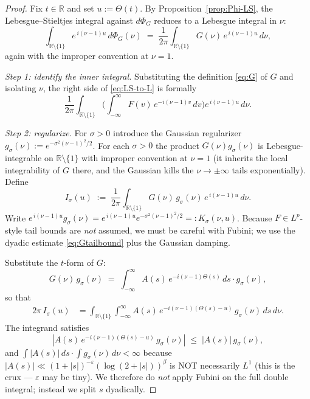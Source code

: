 \documentclass[11pt]{article}
\begin{document}
\begin{proof}
Fix $t\in\mathbb R$ and set $u:=\Theta(t)$. By Proposition~\ref{prop:Phi-LS}, the Lebesgue--Stieltjes integral against $d\Phi_G$ reduces to a Lebesgue integral in $\nu$:
\begin{equation}\label{eq:LS-to-L}
\int_{\mathbb R\setminus\{1\}} e^{\,i(\nu-1)u}\,d\Phi_G(\nu)
\;=\;
\frac{1}{2\pi}\int_{\mathbb R\setminus\{1\}} G(\nu)\,e^{\,i(\nu-1)u}\,d\nu,
\end{equation}
again with the improper convention at $\nu=1$.

\emph{Step 1: identify the inner integral.} Substituting the definition \eqref{eq:G} of $G$ and isolating $\nu$, the right side of \eqref{eq:LS-to-L} is formally
\begin{equation}\label{eq:formal}
\frac{1}{2\pi}\int_{\mathbb R\setminus\{1\}}\!\Biggl(\int_{-\infty}^\infty F(v)\,e^{-i(\nu-1)v}\,dv\Biggr)e^{\,i(\nu-1)u}\,d\nu.
\end{equation}

\emph{Step 2: regularize.} For $\sigma>0$ introduce the Gaussian regularizer $g_\sigma(\nu):=e^{-\sigma^2(\nu-1)^2/2}$. For each $\sigma>0$ the product $G(\nu)g_\sigma(\nu)$ is Lebesgue-integrable on $\mathbb R\setminus\{1\}$ with improper convention at $\nu=1$ (it inherits the local integrability of $G$ there, and the Gaussian kills the $\nu\to\pm\infty$ tails exponentially). Define
\[
I_\sigma(u) \;:=\; \frac{1}{2\pi}\int_{\mathbb R\setminus\{1\}} G(\nu)\,g_\sigma(\nu)\,e^{\,i(\nu-1)u}\,d\nu.
\]
Write $e^{\,i(\nu-1)u}g_\sigma(\nu)=e^{\,i(\nu-1)u}e^{-\sigma^2(\nu-1)^2/2}=:K_\sigma(\nu,u)$. Because $F\in L^{p}$-style tail bounds are \emph{not} assumed, we must be careful with Fubini; we use the dyadic estimate \eqref{eq:Gtailbound} plus the Gaussian damping.

Substitute the $t$-form of $G$:
\[
G(\nu)\,g_\sigma(\nu) \;=\; \int_{-\infty}^\infty A(s)\,e^{-i(\nu-1)\Theta(s)}\,ds\cdot g_\sigma(\nu),
\]
so that
\begin{align*}
2\pi\,I_\sigma(u)
&= \int_{\mathbb R\setminus\{1\}}\!\int_{-\infty}^\infty A(s)\,e^{-i(\nu-1)(\Theta(s)-u)}\,g_\sigma(\nu)\,ds\,d\nu.
\end{align*}
The integrand satisfies
\[
|A(s)\,e^{-i(\nu-1)(\Theta(s)-u)}\,g_\sigma(\nu)| \;\le\; |A(s)|\,g_\sigma(\nu),
\]
and $\int|A(s)|\,ds\cdot\int g_\sigma(\nu)\,d\nu<\infty$ because $|A(s)|\ll(1+|s|)^{-\varepsilon}(\log(2+|s|))^\beta$ is NOT necessarily $L^1$ (this is the crux — $\varepsilon$ may be tiny). We therefore do \emph{not} apply Fubini on the full double integral; instead we split $s$ dyadically.


\end{proof}
\end{document}
